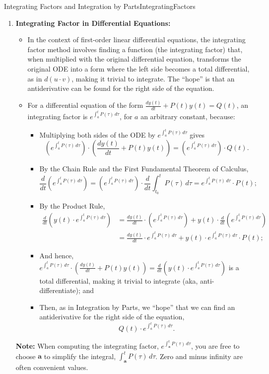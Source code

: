 \begin{factColor}{Integrating Factors and Integration by Parts}{IntegratingFactors}
\begin{enumerate}
    \item \textbf{Integrating Factor in Differential Equations:}
    \begin{itemize}
        \item In the context of first-order linear differential equations, the integrating factor method involves finding a function (the integrating factor) that, when multiplied with the original differential equation, transforms the original ODE into a form where the left side becomes a total differential, as in $d\left(u\cdot v\right)$, making it trivial to integrate. The ``hope'' is that an antiderivative can be found for the right side of the equation.  
        \item For a differential equation of the form \( \frac{dy(t)}{dt} + P(t)y(t) = Q(t) \), an integrating factor is  \( e^{\int_{a}^t P(\tau) \, d\tau} \), for $a$ an arbitrary constant, because:
        \begin{itemize}
        \item Multiplying both sides of the ODE by  \( e^{\int_{a}^t P(\tau) \, d\tau} \) gives
        $$ \left(e^{\int_{a}^t P(\tau) \, d\tau}\right) \cdot \left(\frac{dy(t)}{dt} + P(t)y(t)\right) =\left( e^{\int_{a}^t P(\tau) \, d\tau} \right) \cdot Q(t).$$
            \item By the Chain Rule and the First Fundamental Theorem of Calculus, 
            $$\frac{d}{dt} \left(e^{\int_{a}^t P(\tau) \, d\tau}\right) = \left(e^{\int_{a}^t P(\tau) \, d\tau}\right) \cdot \frac{d}{dt}\int_{t_0}^t P(\tau) \, d\tau = e^{\int_{a}^t P(\tau) \, d\tau} \cdot P(t);$$
            \item By the Product Rule, 
            \begin{align*}
                \frac{d}{dt} \left( y(t) \cdot e^{\int_{a}^t P(\tau) \, d\tau} \right) &=\frac{dy(t)}{dt} \cdot \left(e^{\int_{a}^t P(\tau) \, d\tau} \right)+ y(t) \cdot \frac{d}{dt} \left( e^{\int_{a}^t P(\tau) \, d\tau} \right) \\[1em]
                &= \frac{dy(t)}{dt} \cdot e^{\int_{a}^t P(\tau) \,d\tau} + y(t) \cdot e^{\int_{a}^t P(\tau) \, d\tau} \cdot P(t);
            \end{align*}
            \item And hence, $e^{\int_{a}^t P(\tau) \, d\tau}  \cdot \left(  \frac{dy(t)}{dt} + P(t)y(t)\right) =  \frac{d}{dt} \left( y(t) \cdot e^{\int_{a}^t P(\tau) \, d\tau} \right) $ is a total differential, making it trivial to integrate (aka, anti-differentiate); and 
            \item Then, as in Integration by Parts, we ``hope'' that we can find an antiderivative for the right side of the equation, 
            $$Q(t) \cdot e^{\int_{a}^t P(\tau) \, d\tau}. $$
        \end{itemize}        
    \end{itemize} 
    \textbf{Note:} When computing the integrating factor, $e^{\int_{\bm{a}}^t P(\tau) \, d\tau}$, you are free to choose $\bm{a}$ to simplify the integral, $\int_{\bm{a}}^t P(\tau) \, d\tau$. Zero and minus infinity are often convenient values.
\end{enumerate}
   

\end{factColor}
